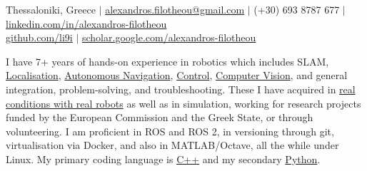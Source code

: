 \documentclass[a4paper,10pt,twoside]{article}
\begin{document}

\par{\bigskip\par}

\begin{center}
{\footnotesize Thessaloniki, Greece $|$ \href{mailto:alexandros.filotheou@gmail.com}{alexandros.filotheou@gmail.com} $|$ (+30) 693 8787 677 $|$ \href{https://www.linkedin.com/in/alexandros-filotheou-5b6a8676/}{linkedin.com/in/alexandros-filotheou} \\ \href{https://github.com/li9i/}{github.com/li9i} $|$  \href{https://scholar.google.com/citations?hl=en&user=9_hI4hMAAAAJ&view_op=list_works}{scholar.google.com/alexandros-filotheou}}\vspace{1em}
\end{center}

\vspace{-0.5cm}
\begin{bw_box} \small
  \hspace{1em}I have 7+ years of hands-on experience in robotics which includes SLAM, \href{https://github.com/li9i/fsm-lo}{Localisation},
  \href{https://link.springer.com/article/10.1007/s10846-019-01086-y}{Autonomous Navigation}, \href{https://www.tandfonline.com/doi/full/10.1080/00207179.2018.1514129}{Control},
  \href{https://github.com/li9i/pandora\_vision\_2014}{Computer Vision}, and
  general integration, problem-solving, and troubleshooting. These I have acquired in \href{https://relief.web.auth.gr/\%CF\%81\%CE\%BF\%CE\%BC\%CF\%80\%CE\%BF\%CF\%84\%CE\%B9\%CE\%BA\%CE\%AC-\%CE\%BF\%CF\%87\%CE\%AE\%CE\%BC\%CE\%B1\%CF\%84\%CE\%B1/}{real
  conditions with real robots} as well as in simulation, working for research
  projects funded by the European Commission and the Greek State, or through
  volunteering. I am proficient in ROS and ROS 2, in versioning through git, virtualisation via Docker, and also in MATLAB/Octave, all
  the while under Linux. My primary coding language is \href{https://github.com/li9i/fsm}{C++} and my secondary
  \href{https://github.com/cultureid-auth-ros-packages/cultureid-waypoints-following}{Python}.
\end{bw_box}
\end{document}
